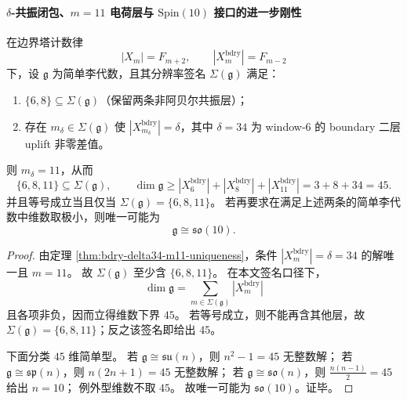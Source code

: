 \paragraph{\texorpdfstring{$\delta$}{δ}-共振闭包、\texorpdfstring{$m=11$}{m=11} 电荷层与 \texorpdfstring{$\mathrm{Spin}(10)$}{Spin(10)} 接口的进一步刚性}

\begin{theorem}\label{thm:m11-delta-closure-unique-minimal-so10}
在边界塔计数律
\[
|X_m|=F_{m+2},\qquad |X_m^{\mathrm{bdry}}|=F_{m-2}
\]
下，设 \(\mathfrak g\) 为简单李代数，且其分辨率签名 \(\Sigma(\mathfrak g)\) 满足：
\begin{enumerate}
  \item \(\{6,8\}\subseteq \Sigma(\mathfrak g)\)（保留两条非阿贝尔共振层）；
  \item 存在 \(m_\delta\in \Sigma(\mathfrak g)\) 使 \(|X_{m_\delta}^{\mathrm{bdry}}|=\delta\)，其中 \(\delta=34\) 为 window-\(6\) 的 boundary 二层 uplift 非零差值。
\end{enumerate}
则 \(m_\delta=11\)，从而
\[
\{6,8,11\}\subseteq \Sigma(\mathfrak g),
\qquad
\dim\mathfrak g\ge |X_6^{\mathrm{bdry}}|+|X_8^{\mathrm{bdry}}|+|X_{11}^{\mathrm{bdry}}|
=3+8+34=45.
\]
并且等号成立当且仅当 \(\Sigma(\mathfrak g)=\{6,8,11\}\)。
若再要求在满足上述两条的简单李代数中维数取极小，则唯一可能为
\[
\mathfrak g\cong \mathfrak{so}(10).
\]
\end{theorem}
\begin{proof}
由定理 \ref{thm:bdry-delta34-m11-uniqueness}，条件 \(|X_m^{\mathrm{bdry}}|=\delta=34\) 的解唯一且 \(m=11\)。
故 \(\Sigma(\mathfrak g)\) 至少含 \(\{6,8,11\}\)。
在本文签名口径下，
\[
\dim\mathfrak g=\sum_{m\in\Sigma(\mathfrak g)}|X_m^{\mathrm{bdry}}|
\]
且各项非负，因而立得维数下界 \(45\)。
若等号成立，则不能再含其他层，故 \(\Sigma(\mathfrak g)=\{6,8,11\}\)；反之该签名即给出 \(45\)。
\par
下面分类 \(45\) 维简单型。
若 \(\mathfrak g\cong\mathfrak{su}(n)\)，则 \(n^2-1=45\) 无整数解；
若 \(\mathfrak g\cong\mathfrak{sp}(n)\)，则 \(n(2n+1)=45\) 无整数解；
若 \(\mathfrak g\cong\mathfrak{so}(n)\)，则 \(\frac{n(n-1)}{2}=45\) 给出 \(n=10\)；
例外型维数不取 \(45\)。
故唯一可能为 \(\mathfrak{so}(10)\)。证毕。
\end{proof}

